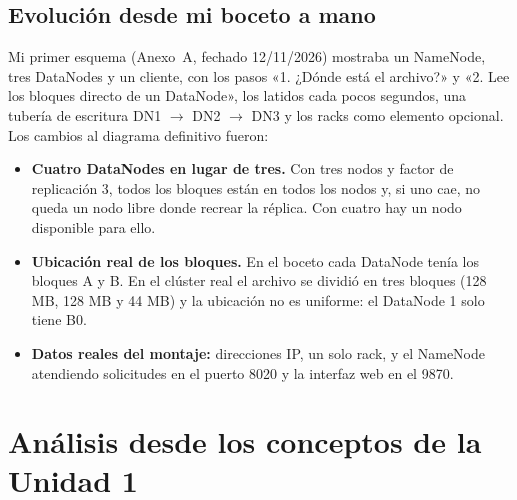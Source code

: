 \documentclass[11pt,a4paper]{article}
\begin{document}
\subsection{Evolución desde mi boceto a mano}
Mi primer esquema (Anexo~A, fechado 12/11/2026) mostraba un NameNode, tres DataNodes y un cliente, con los pasos «1. ¿Dónde está el archivo?» y «2. Lee los bloques directo de un DataNode», los latidos cada pocos segundos, una tubería de escritura DN1 $\to$ DN2 $\to$ DN3 y los racks como elemento opcional. Los cambios al diagrama definitivo fueron:
\begin{itemize}
  \item \textbf{Cuatro DataNodes en lugar de tres.} Con tres nodos y factor de replicación 3, todos los bloques están en todos los nodos y, si uno cae, no queda un nodo libre donde recrear la réplica. Con cuatro hay un nodo disponible para ello.
  \item \textbf{Ubicación real de los bloques.} En el boceto cada DataNode tenía los bloques A y B. En el clúster real el archivo se dividió en tres bloques (128 MB, 128 MB y 44 MB) y la ubicación no es uniforme: el DataNode 1 solo tiene B0.
  \item \textbf{Datos reales del montaje:} direcciones IP, un solo rack, y el NameNode atendiendo solicitudes en el puerto 8020 y la interfaz web en el 9870.
\end{itemize}

\section{Análisis desde los conceptos de la Unidad 1}\label{sec:analisis}
\end{document}
